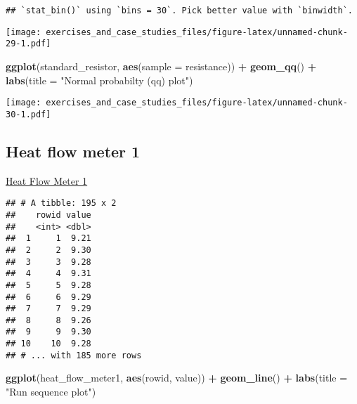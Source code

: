 \documentclass[]{book}
\newenvironment{Shaded}{\begin{snugshade}}{\end{snugshade}}
\newcommand{\DataTypeTok}[1]{\textcolor[rgb]{0.13,0.29,0.53}{#1}}
\newcommand{\DecValTok}[1]{\textcolor[rgb]{0.00,0.00,0.81}{#1}}
\newcommand{\KeywordTok}[1]{\textcolor[rgb]{0.13,0.29,0.53}{\textbf{#1}}}
\newcommand{\NormalTok}[1]{#1}
\newcommand{\OperatorTok}[1]{\textcolor[rgb]{0.81,0.36,0.00}{\textbf{#1}}}
\newcommand{\StringTok}[1]{\textcolor[rgb]{0.31,0.60,0.02}{#1}}
\theoremstyle{definition}
\theoremstyle{definition}
\theoremstyle{definition}
\theoremstyle{remark}
\begin{document}
\begin{verbatim}
## `stat_bin()` using `bins = 30`. Pick better value with `binwidth`.
\end{verbatim}

\texttt{[image: exercises\_and\_case\_studies\_files/figure-latex/unnamed-chunk-29-1.pdf]}

\begin{Shaded}
\begin{Highlighting}[]
\KeywordTok{ggplot}\NormalTok{(standard_resistor, }\KeywordTok{aes}\NormalTok{(}\DataTypeTok{sample =}\NormalTok{ resistance)) }\OperatorTok{+}
\StringTok{  }\KeywordTok{geom_qq}\NormalTok{() }\OperatorTok{+}
\StringTok{  }\KeywordTok{labs}\NormalTok{(}\DataTypeTok{title =} \StringTok{"Normal probabilty (qq) plot"}\NormalTok{)}
\end{Highlighting}
\end{Shaded}

\texttt{[image: exercises\_and\_case\_studies\_files/figure-latex/unnamed-chunk-30-1.pdf]}

\hypertarget{heat-flow-meter-1}{%
\subsection{Heat flow meter 1}\label{heat-flow-meter-1}}

\href{https://www.itl.nist.gov/div898/handbook/eda/section4/eda428.htm}{Heat
Flow Meter 1}

\begin{Shaded}
\end{Shaded}

\begin{verbatim}
## # A tibble: 195 x 2
##    rowid value
##    <int> <dbl>
##  1     1  9.21
##  2     2  9.30
##  3     3  9.28
##  4     4  9.31
##  5     5  9.28
##  6     6  9.29
##  7     7  9.29
##  8     8  9.26
##  9     9  9.30
## 10    10  9.28
## # ... with 185 more rows
\end{verbatim}

\begin{Shaded}
\begin{Highlighting}[]
\KeywordTok{ggplot}\NormalTok{(heat_flow_meter1, }\KeywordTok{aes}\NormalTok{(rowid, value)) }\OperatorTok{+}
\StringTok{  }\KeywordTok{geom_line}\NormalTok{() }\OperatorTok{+}
\StringTok{  }\KeywordTok{labs}\NormalTok{(}\DataTypeTok{title =} \StringTok{"Run sequence plot"}\NormalTok{)}
\end{Highlighting}
\end{Shaded}
\end{document}
